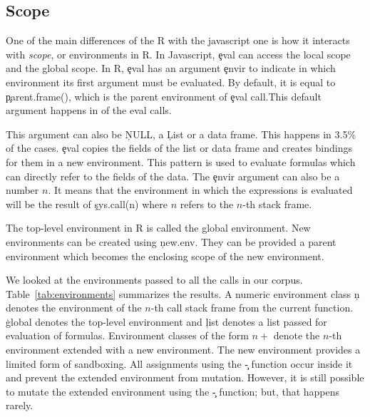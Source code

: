 \documentclass[conference]{IEEEtran}
\begin{document}
\subsection{Scope}

One of the main differences of the R \eval with the javascript one is how it
interacts with \emph{scope}, or environments in R. In Javascript, \c{eval} can
access the local scope and the global scope. In R, \c{eval} has an argument
\c{envir} to indicate in which environment its first argument must be evaluated.
By default, it is equal to \c{parent.frame()}, 
which is the parent environment of \c{eval} call.This default argument
happens in \DefaultEnvirExprPercent of the eval calls.

This argument can also be \c{NULL}, a \c{List} or a data frame. This happens in
3.5\% of the cases.
\c{eval} copies the fields of the list or data frame and creates bindings for
them in a new environment. This pattern is used to evaluate formulas which can
directly refer to the fields of the data.
The \c{envir} argument can also be a number $n$. It means that the environment in
which the expressions is evaluated will be the result of \c{sys.call(n)} where
$n$ refers to the $n$-th stack frame.

The top-level environment in R is called the global environment. New
environments can be created using \c{new.env}. They can be provided a parent
environment which becomes the enclosing scope of the new environment.

We looked at the environments passed to all the \eval calls in our corpus.
Table~\ref{tab:environments} summarizes the results. A numeric environment class
\c{n} denotes the environment of the $n$-th call stack frame from the current
function. \c{global} denotes the top-level environment and \c{list} denotes a list
passed for evaluation of formulas. Environment classes of the form $n+$ denote
the $n$-th environment extended with a new environment. The new environment
provides a limited form of sandboxing. All assignments using the \c{\<-}
function occur inside it and prevent the extended environment from
mutation. However, it is still possible to mutate the extended environment
using the \c{\<\<-} function; but, that happens rarely.
\end{document}
